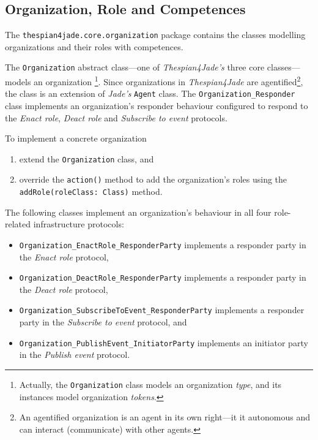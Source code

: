\subsection{Organization, Role and Competences}

The \texttt{thespian4jade.core.organization} package contains the classes modelling organizations and their roles with competences.

The \texttt{Organization} abstract class---one of \textit{Thespian4Jade's} three core classes---models an organization
\footnote{Actually, the \texttt{Organization} class models an organization \textit{type}, and its instances model organization \textit{tokens}.}.
Since organizations in \textit{Thespian4Jade} are agentified\footnote{An agentified organization is an agent in its own right---it it autonomous and can interact (communicate) with other agents.}, the class is an extension of \textit{Jade's} \texttt{Agent} class.
The \texttt{Organization\_Responder} class implements an organization's responder behaviour configured to respond to the \textit{Enact role}, \textit{Deact role} and \textit{Subscribe to event} protocols.

To implement a concrete organization
\begin{enumerate}
	\item extend the \texttt{Organization} class, and
	\item override the \texttt{action()} method to add the organization's roles using the \texttt{addRole(roleClass: Class)} method.
\end{enumerate}

The following classes implement an organization's behaviour in all four role-related infrastructure protocols:
\begin{itemize}
	\item \texttt{Organization\_EnactRole\_ResponderParty} implements a responder party in the \textit{Enact role} protocol,
	\item \texttt{Organization\_DeactRole\_ResponderParty} implements a responder party in the \textit{Deact role} protocol,
	\item \texttt{Organization\_SubscribeToEvent\_ResponderParty} implements a responder party in the \textit{Subscribe to event} protocol, and
	\item \texttt{Organization\_PublishEvent\_InitiatorParty} implements an initiator party in the \textit{Publish event} protocol.
\end{itemize}


